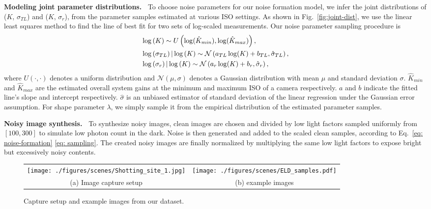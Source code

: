 \documentclass[10pt,twocolumn,letterpaper]{article}
\begin{document}
\vspace{3pt}
\noindent\textbf{Modeling joint parameter distributions.~}
To choose noise parameters for our noise formation model, we infer the
joint distributions of ($K$, $\sigma_{TL}$) and
($K$, $\sigma_{r}$), from the parameter samples estimated at various ISO settings.
As shown in Fig.~\ref{fig:joint-dist}, we use the linear least squares method to find the line of best fit for two sets of log-scaled measurements. Our noise parameter sampling procedure is
\vspace{-2mm}
\begin{align}
&\log \left( K \right)  \sim U \left( \log (\hat{K}_{min}), \log (\hat{K}_{max}) \right), \nonumber  \\   \label{eq: sampling}
&\log \left( \sigma_{TL} \right) | \log \left( K \right) \sim \mathcal{N} \left(a_{TL} \log (K)  + b_{TL} ,  \hat{\sigma}_{TL} \right), \\  
 &\log \left( \sigma_{r} \right) | \log \left( K \right) \sim \mathcal{N} \left(a_{r} \log (K)  + b_{r} ,  \hat{\sigma}_{r} \right),  \nonumber
 \vspace{-2mm}
\end{align}
where $U(\cdot,\cdot)$ denotes a uniform distribution and $\mathcal{N} (\mu, \sigma)$ denotes a Gaussian distribution with mean
$\mu$ and standard deviation $\sigma$. $\hat{K}_{min}$ and $\hat{K}_{max}$ are
the estimated overall system gains at the minimum and maximum ISO of a camera
respectively. $a$ and $b$ indicate the fitted line's slope and intercept respectively.
 $\hat{\sigma}$ is an unbiased
estimator of standard deviation of the linear regression under the Gaussian error
assumption. For shape parameter $\lambda$, we simply sample it from the
empirical distribution of the estimated parameter samples.

\vspace{3pt}
\noindent\textbf{Noisy image synthesis.~}
To synthesize noisy images, clean images are chosen and divided by low light factors sampled uniformly from $[100, 300]$ to simulate low photon count in the dark. Noise is then generated and added to
the scaled clean samples, according to Eq.~\eqref{eq: noise-formation}
\eqref{eq: sampling}. The created noisy images are finally normalized by multiplying the same low light factors to expose bright but excessively noisy contents.


\begin{figure}[!t]
\centering
\setlength\tabcolsep{0.8pt}
\begin{tabular}{cc}
\texttt{[image: ./figures/scenes/Shotting\_site\_1.jpg]} &
\texttt{[image: ./figures/scenes/ELD\_samples.pdf]} \\
\footnotesize (a) Image capture setup & \footnotesize (b) example images  \\
\end{tabular}
\caption{Capture setup and example images from our dataset.}
\label{fig:dataset}
\end{figure}
\end{document}
